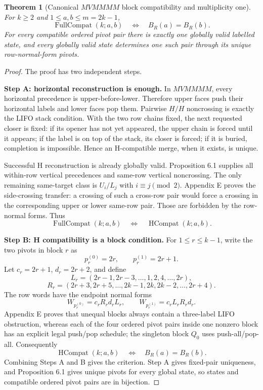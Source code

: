 \documentclass[11pt]{article}
\newtheorem{theorem}{Theorem}[section]
\theoremstyle{definition}
\theoremstyle{remark}
\begin{document}
\begin{theorem}[Canonical $MVMMMM$ block compatibility and multiplicity one]\label{obj:T3}
For \(k\ge2\) and \(1\le a,b\le m=2k-1\), \[
\operatorname{FullCompat}(k;a,b)
\quad\Longleftrightarrow\quad
B_R(a)=B_R(b).
\] For every compatible ordered pivot pair there is exactly one globally
valid labelled state, and every globally valid state determines one such
pair through its unique row-normal-form pivots.
\end{theorem}
\begin{proof}
 The proof has two independent steps.

\textbf{Step A: horizontal reconstruction is enough.} In \(MVMMMM\),
every horizontal precedence is upper-before-lower. Therefore upper faces
push their horizontal labels and lower faces pop them. Pairwise \(H/H\)
noncrossing is exactly the LIFO stack condition. With the two row chains
fixed, the next requested closer is fixed: if its opener has not yet
appeared, the upper chain is forced until it appears; if the label is on
top of the stack, its closer is forced; if it is buried, completion is
impossible. Hence an H-compatible merge, when it exists, is unique.

Successful H reconstruction is already globally valid. Proposition 6.1
supplies all within-row vertical precedences and same-row vertical
noncrossing. The only remaining same-target class is \(U_i/L_j\) with
\(i\equiv j\pmod2\). Appendix E proves the side-crossing transfer: a
crossing of such a cross-row pair would force a crossing in the
corresponding upper or lower same-row pair. Those are forbidden by the
row-normal forms. Thus \[
\operatorname{FullCompat}(k;a,b)
\quad\Longleftrightarrow\quad
\operatorname{HCompat}(k;a,b).
\]

\textbf{Step B: H compatibility is a block condition.} For
\(1\le r\le k-1\), write the two pivots in block \(r\) as \[
p_r^{(0)}=2r,\qquad p_r^{(1)}=2r+1.
\] Let \(c_r=2r+1\), \(d_r=2r+2\), and define \[
L_r=(2r-1,2r-3,\ldots,1,2,4,\ldots,2r),
\] \[
R_r=(2r+3,2r+5,\ldots,2k-1,2k,2k-2,\ldots,2r+4).
\] The row words have the endpoint normal forms \[
W_{p_r^{(0)}}=c_rR_rd_rL_r,
\qquad
W_{p_r^{(1)}}=c_rL_rR_rd_r.
\] Appendix E proves that unequal blocks always contain a three-label
LIFO obstruction, whereas each of the four ordered pivot pairs inside
one nonzero block has an explicit legal push/pop schedule; the singleton
block \(Q_0\) uses push-all/pop-all. Consequently \[
\operatorname{HCompat}(k;a,b)
\quad\Longleftrightarrow\quad
B_R(a)=B_R(b).
\] Combining Steps A and B gives the criterion. Step A gives fixed-pair
uniqueness, and Proposition 6.1 gives unique pivots for every global
state, so states and compatible ordered pivot pairs are in bijection.
\end{proof}
\end{document}
